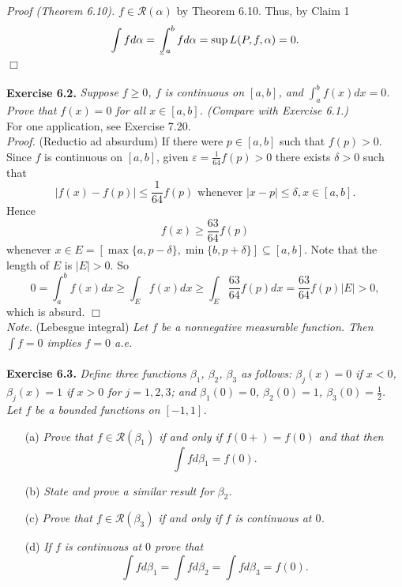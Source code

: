 \documentclass{article}
\def\lowint{\mkern3mu\underline{\vphantom{\intop}\mkern7mu}\mkern-10mu\int}
\begin{document}
\emph{Proof (Theorem 6.10).}
$f \in \mathscr{R}(\alpha)$ by Theorem 6.10.
Thus, by Claim 1
$$\int f d \alpha = \lowint_a^b f d\alpha = \sup L(P, f, \alpha) = 0.$$
$\Box$ \\\\






\textbf{Exercise 6.2.}
\emph{Suppose $f \geq 0$,
$f$ is continuous on $[a,b]$, and $\int_{a}^{b} f(x) dx = 0$.
Prove that $f(x) = 0$ for all $x \in [a,b]$.
(Compare with Exercise 6.1.)} \\

For one application, see Exercise 7.20. \\

\emph{Proof.}
(Reductio ad absurdum)
If there were $p \in [a,b]$ such that $f(p) > 0$.
Since $f$ is continuous on $[a,b]$, given $\varepsilon = \frac{1}{64}f(p) > 0$
there exists $\delta > 0$
such that
\[
  |f(x) - f(p)| \leq \frac{1}{64}f(p) \text{ whenever } |x-p| \leq \delta, x \in [a,b].
\]
Hence
\[
  f(x) \geq \frac{63}{64}f(p)
\]
whenever $x \in E = [\max\{a,p-\delta\}, \min\{b,p+\delta\}] \subseteq [a,b]$.
Note that the length of $E$ is $|E| > 0$.
So
\[
  0
  = \int_{a}^{b} f(x) dx
  \geq \int_{E} f(x) dx
  \geq \int_{E} \frac{63}{64}f(p) dx
  = \frac{63}{64}f(p)|E| > 0,
\]
which is absurd.
$\Box$ \\

\emph{Note.}
(Lebesgue integral)
\emph{Let $f$ be a nonnegative measurable function.
Then $\int f = 0$ implies $f = 0$ a.e.} \\\\






\textbf{Exercise 6.3.}
\emph{Define three functions $\beta_1$, $\beta_2$, $\beta_3$ as follows:
$\beta_j(x) = 0$ if $x < 0$, $\beta_j(x) = 1$ if $x > 0$ for $j=1,2,3$;
and $\beta_1(0) = 0$, $\beta_2(0) = 1$, $\beta_3(0) = \frac{1}{2}$.
Let $f$ be a bounded functions on $[-1,1]$.}
\begin{enumerate}
\item[(a)]
  \emph{Prove that $f \in \mathscr{R}(\beta_1)$ if and only if $f(0+) = f(0)$ and that then
  \[
    \int f d\beta_1 = f(0).
  \]}
\item[(b)]
  \emph{State and prove a similar result for $\beta_2$.}

\item[(c)]
  \emph{Prove that $f \in \mathscr{R}(\beta_3)$ if and only if $f$ is continuous at $0$.}

\item[(d)]
  \emph{If $f$ is continuous at $0$ prove that
  \[
    \int f d\beta_1 = \int f d\beta_2 = \int f d\beta_3 = f(0).
  \]} \\
\end{enumerate}
\end{document}
